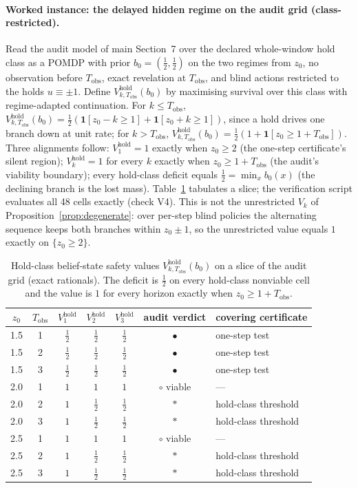 \documentclass[11pt,a4paper]{article}
\theoremstyle{plain}
\theoremstyle{definition}
\theoremstyle{remark}
\newcommand{\Tobs}{T_{\mathrm{obs}}}
\begin{document}
\paragraph{Worked instance: the delayed hidden regime on the audit grid (class-restricted).} Read the audit model of main Section~7 over the declared whole-window hold class as a POMDP with prior $b_0=(\tfrac12,\tfrac12)$ on the two regimes from $z_0$, no observation before $\Tobs$, exact revelation at $\Tobs$, and blind actions restricted to the holds $u\equiv\pm1$. Define $V^{\mathrm{hold}}_{k,\Tobs}(b_0)$ by maximising survival over this class with regime-adapted continuation. For $k\le\Tobs$, $V^{\mathrm{hold}}_{k,\Tobs}(b_0)=\tfrac12(\mathbf 1[z_0-k\ge1]+\mathbf 1[z_0+k\ge1])$, since a hold drives one branch down at unit rate; for $k>\Tobs$, $V^{\mathrm{hold}}_{k,\Tobs}(b_0)=\tfrac12(1+\mathbf 1[z_0\ge1+\Tobs])$. Three alignments follow: $V^{\mathrm{hold}}_1=1$ exactly when $z_0\ge2$ (the one-step certificate's silent region); $V^{\mathrm{hold}}_k=1$ for every $k$ exactly when $z_0\ge1+\Tobs$ (the audit's viability boundary); every hold-class deficit equals $\tfrac12=\min_xb_0(x)$ (the declining branch is the lost mass). Table~\ref{tab:beliefV} tabulates a slice; the verification script evaluates all 48 cells exactly (check V4). This is not the unrestricted $V_k$ of Proposition~\ref{prop:degenerate}: over per-step blind policies the alternating sequence keeps both branches within $z_0\pm1$, so the unrestricted value equals $1$ exactly on $\{z_0\ge2\}$.

\begin{table}[htbp]
\centering\small
\begin{tabular}{@{}ccccccl@{}}
\toprule
$z_0$ & $\Tobs$ & $V^{\mathrm{hold}}_1$ & $V^{\mathrm{hold}}_2$ & $V^{\mathrm{hold}}_3$ & audit verdict & covering certificate\\
\midrule
1.5 & 1 & $\tfrac12$ & $\tfrac12$ & $\tfrac12$ & $\bullet$ & one-step test\\
1.5 & 2 & $\tfrac12$ & $\tfrac12$ & $\tfrac12$ & $\bullet$ & one-step test\\
1.5 & 3 & $\tfrac12$ & $\tfrac12$ & $\tfrac12$ & $\bullet$ & one-step test\\
2.0 & 1 & $1$ & $1$ & $1$ & $\circ$ viable & ---\\
2.0 & 2 & $1$ & $\tfrac12$ & $\tfrac12$ & $\ast$ & hold-class threshold\\
2.0 & 3 & $1$ & $\tfrac12$ & $\tfrac12$ & $\ast$ & hold-class threshold\\
2.5 & 1 & $1$ & $1$ & $1$ & $\circ$ viable & ---\\
2.5 & 2 & $1$ & $\tfrac12$ & $\tfrac12$ & $\ast$ & hold-class threshold\\
2.5 & 3 & $1$ & $\tfrac12$ & $\tfrac12$ & $\ast$ & hold-class threshold\\
\bottomrule
\end{tabular}
\caption{Hold-class belief-state safety values $V^{\mathrm{hold}}_{k,\Tobs}(b_0)$ on a slice of the audit grid (exact rationals). The deficit is $\tfrac12$ on every hold-class nonviable cell and the value is $1$ for every horizon exactly when $z_0\ge1+\Tobs$.}
\label{tab:beliefV}
\end{table}
\end{document}

